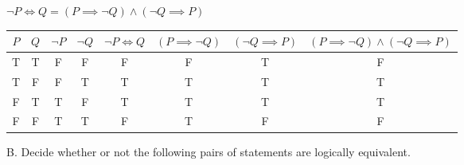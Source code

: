 \documentclass[DIN, pagenumber=false, fontsize=11pt, parskip=half]{scrartcl}
\begin{document}
\begin{problems}
    \problem $\lnot P \iff Q = (P \implies \lnot Q) \land (\lnot Q \implies P)$
    \answer
    \begin{center}
        \footnotesize
        \setlength{\tabcolsep}{4pt}
        \begin{tabular}{cccccccc}
            $P$ & $Q$ & $\lnot P$ & $\lnot Q$ & $\lnot P \iff Q$ & $(P \implies \lnot Q)$ & $(\lnot Q \implies P)$ & $(P \implies \lnot Q) \land (\lnot Q \implies P)$\\
            \midrule
            T & T & F & F & F & F & T & F\\
            T & F & F & T & T & T & T & T\\
            F & T & T & F & T & T & T & T\\
            F & F & T & T & F & T & F & F
        \end{tabular}
    \end{center}
\end{problems}

\begin{exercise}{B.}
    Decide whether or not the following pairs of statements are logically equivalent.
\end{exercise}
\end{document}
